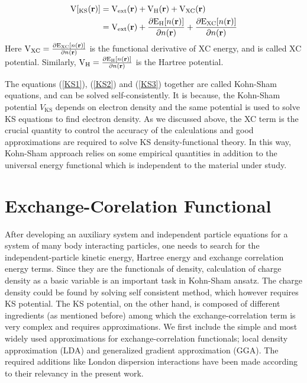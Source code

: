 \begin{align}
{\rm V}[_{\text{KS}}({\bf r})] & = {\rm V}_{\text{ext}}({\bf r}) + {\rm V}_{\rm H}({\bf r}) + {\rm V}_{\rm XC}({\bf r}) \nonumber \\
                  & = {\rm V}_{\text{ext}}({\bf r}) + \frac{\partial {\rm E}_{\rm H}[n({\bf r})]}{\partial n({\bf r})} + \frac{\partial {\rm E}_{\rm XC}[n({\bf r})]}{\partial n({\bf r})} \label{KS3}
\end{align} 
Here ${\rm V}_{\rm XC} = \frac{\partial {\rm E}_{\rm XC}[n({\bf r})]}{\partial n({\bf r})}$ is the functional derivative of XC energy, and is called XC potential. Similarly, ${\rm V}_{\rm H} = \frac{\partial {\rm E}_{\rm H}[n({\bf r})]}{\partial n({\bf r})}$ is the Hartree potential.

The equations (\ref{KS1}), (\ref{KS2}) and (\ref{KS3}) together are called Kohn-Sham equations, and can be solved self-consistently. It is because, the Kohn-Sham potential $V_{\text{KS}}$ depends on electron density and the same potential is used to solve KS equations to find electron density. As we discussed above, the XC term is the crucial quantity to control the accuracy of the calculations and good approximations are required to solve KS density-functional theory. In this way, Kohn-Sham approach relies on some empirical quantities in addition to the universal energy functional which is independent to the material under study.
\section{Exchange-Corelation Functional}
After developing  an auxiliary system and independent particle equations for a system of many body interacting particles, one needs to search for the independent-particle kinetic energy, Hartree energy and exchange correlation energy terms. Since they are the functionals of density, calculation of
charge density as a basic variable is an important task in Kohn-Sham ansatz. The charge density could be found by solving self consistent method, which however requires KS potential. The KS potential, on the other hand, is composed of different ingredients (as mentioned before) among which the exchange-correlation term is very complex and requires approximations. We first include the simple and most widely used approximations for exchange-correlation functionals; local density approximation (LDA) and generalized gradient approximation (GGA). The required additions like London dispersion interactions have been made according to their relevancy in the present work.
